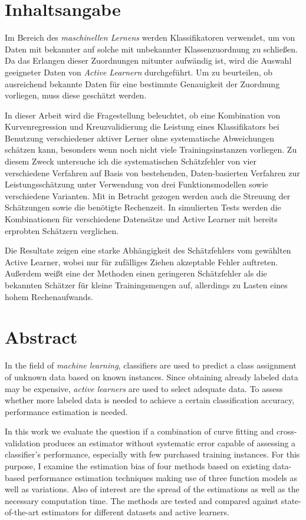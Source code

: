 \chapter*{Inhaltsangabe}

Im Bereich des \textit{maschinellen Lernens} werden Klassifikatoren verwendet, um von Daten mit bekannter auf solche mit unbekannter Klassenzuordnung zu schließen. Da das Erlangen dieser Zuordnungen mitunter aufwändig ist, wird die Auswahl geeigneter Daten von \textit{Active Learnern} durchgeführt. Um zu beurteilen, ob ausreichend bekannte Daten für eine bestimmte Genauigkeit der Zuordnung vorliegen, muss diese geschätzt werden.

In dieser Arbeit wird die Fragestellung beleuchtet, ob eine Kombination von Kurvenregression und Kreuzvalidierung die Leistung eines Klassifikators bei Benutzung verschiedener aktiver Lerner ohne systematische Abweichungen schätzen kann, besonders wenn noch nicht viele Trainingsinstanzen vorliegen. Zu diesem Zweck untersuche ich die systematischen Schätzfehler von vier verschiedene Verfahren auf Basis von bestehenden, Daten-basierten Verfahren zur Leistungsschätzung unter Verwendung von drei Funktionsmodellen sowie verschiedene Varianten. Mit in Betracht gezogen werden auch die Streuung der Schätzungen sowie die benötigte Rechenzeit. In simulierten Tests werden die Kombinationen für verschiedene Datensätze und Active Learner mit bereits erprobten Schätzern verglichen.

Die Resultate zeigen eine starke Abhängigkeit des Schätzfehlers vom gewählten Active Learner, wobei nur für zufälliges Ziehen akzeptable Fehler auftreten. Außerdem weißt eine der Methoden einen geringeren Schätzfehler als die bekannten Schätzer für kleine Trainingsmengen auf, allerdings zu Lasten eines hohem Rechenaufwands.


\chapter*{Abstract}

In the field of \textit{machine learning}, classifiers are used to predict a class assignment of unknown data based on known instances. Since obtaining already labeled data may be expensive, \textit{active learners} are used to select adequate data. To assess whether more labeled data is needed to achieve a certain classification accuracy, performance estimation is needed.

In this work we evaluate the question if a combination of curve fitting and cross-validation produces an estimator without systematic error capable of assessing a classifier's performance, especially with few purchased training instances. For this purpose, I examine the estimation bias of four methods based on existing data-based performance estimation techniques making use of three function models as well as variations. Also of interest are the spread of the estimations as well as the necessary computation time. The methods are tested and compared against state-of-the-art estimators for different datasets and active learners.

